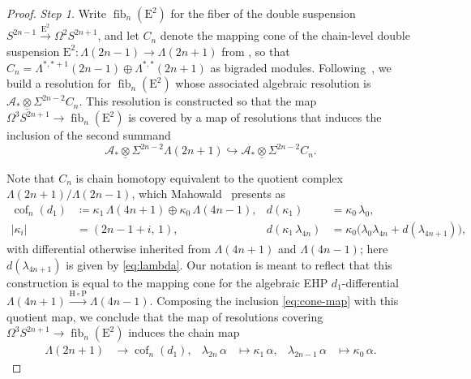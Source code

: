 \documentclass[dvipsnames,table]{amsart}
\theoremstyle{definition}
\theoremstyle{remark}
\numberwithin{equation}{section}
\begin{document}
\begin{proof}
\textit{Step 1.}
  Write $\operatorname{fib}_n(\mathrm{E}^2)$ for the fiber of the double suspension $S^{2n - 1} \xrightarrow{\mathrm{E}^2} \Omega^2 S^{2n + 1}$, and let $C_n$ denote the mapping cone of the chain-level double suspension $\mathrm{E}^2 \colon \Lambda(2n - 1) \to \Lambda(2n + 1)$ from , so that $C_n = \Lambda^{\ast, \ast + 1}(2n - 1) \oplus \Lambda^{\ast, \ast}(2n + 1)$ as bigraded modules. Following~\cite{Mahowald_Thompson_1987}, we build a resolution for $\operatorname{fib}_n(\mathrm{E}^2)$ whose associated algebraic resolution is $\mathcal{A}_* \underline{\otimes} \Sigma^{2n - 2} C_n$. This resolution is constructed so that the map $\Omega^3 S^{2n + 1} \to \operatorname{fib}_n(\mathrm{E}^2)$ is covered by a map of resolutions that induces the inclusion of the second summand
  \begin{equation}
    \label{eq:cone-map}
    \mathcal{A}_* \underline{\otimes} \Sigma^{2n - 2} \Lambda(2n + 1) \hookrightarrow \mathcal{A}_* \underline{\otimes} \Sigma^{2n - 2} C_n.
  \end{equation}




  Note that $C_n$ is chain homotopy equivalent to the quotient complex $\Lambda(2n + 1)/\Lambda(2n - 1)$, which Mahowald~\cite[Section~2]{Mahowald_1975} presents as
\begin{align*}
  \operatorname{cof}_n(d_1)
  &\coloneqq \kappa_1\, \Lambda(4n + 1) \oplus  \kappa_0\, \Lambda(4n - 1) ,
  &
  d(\kappa_1) &= \kappa_0\, \lambda_0,
  \\
  |\kappa_i| &= (2n - 1 + i,\, 1),
  &
  d(\kappa_1\, \lambda_{4n}) &= \kappa_0\bigl(\lambda_0 \lambda_{4n} + d(\lambda_{4n+1})\bigr),
\end{align*}
with differential otherwise inherited from $\Lambda(4n + 1)$ and $\Lambda(4n - 1)$; here $d(\lambda_{4n + 1})$ is given by \eqref{eq:lambda}. Our notation is meant to reflect that this construction is equal to the mapping cone for the algebraic EHP $d_1$-differential $\Lambda(4n + 1) \xrightarrow{\mathrm{H} \circ \mathrm{P}} \Lambda(4n - 1)$. Composing the inclusion \eqref{eq:cone-map} with this quotient map, we conclude that the map of resolutions covering $\Omega^3 S^{2n + 1} \to \operatorname{fib}_n(\mathrm{E}^2)$ induces the chain map
\begin{equation}
\label{eq:firstmap}
\begin{aligned}
  \Lambda(2n + 1) &\to \operatorname{cof}_n(d_1),
  & \lambda_{2n}\,\alpha &\mapsto \kappa_1\,\alpha,
  & \lambda_{2n - 1}\,\alpha &\mapsto \kappa_0\,\alpha.
\end{aligned}
\end{equation}


\end{proof}
\end{document}
